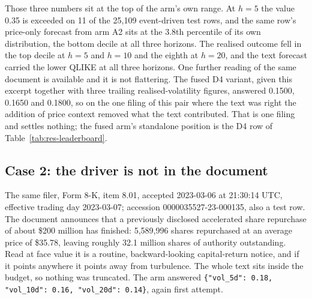 Those three numbers sit at the top of the arm's own range. At $h{=}5$ the
value 0.35 is exceeded on 11 of the 25{,}109 event-driven test rows, and the
same row's price-only forecast from arm A2 sits at the 3.8th percentile of its
own distribution, the bottom decile at all three horizons. %
The realised outcome fell in the top decile at $h{=}5$ and $h{=}10$ and the
eighth at $h{=}20$, and the text forecast carried the lower QLIKE at all three
horizons. %
One further reading of the same document is available and it is not
flattering. The fused D4 variant, given this excerpt together with three
trailing realised-volatility figures, answered 0.1500, 0.1650 and 0.1800, so
on the one filing of this pair where the text was right the addition of price
context removed what the text contributed. %
That is one filing and settles nothing; the fused arm's standalone position is
the D4 row of Table~\ref{tab:res-leaderboard}.

\subsection*{Case 2: the driver is not in the document}

The same filer, Form 8-K, item 8.01, accepted 2023-03-06 at 21:30:14 UTC,
effective trading day 2023-03-07; accession 0000035527-23-000135, also a test
row. %
The document announces that a previously disclosed accelerated share
repurchase of about \$200 million has finished: 5{,}589{,}996 shares
repurchased at an average price of \$35.78, leaving roughly 32.1 million
shares of authority outstanding. %
Read at face value it is a routine,
backward-looking capital-return notice, and if it points anywhere it points
away from turbulence. The whole text sits inside the
budget, so nothing was truncated. %
The arm answered \texttt{\{"vol\_5d": 0.18, "vol\_10d": 0.16, "vol\_20d":
0.14\}}, again first attempt. %

